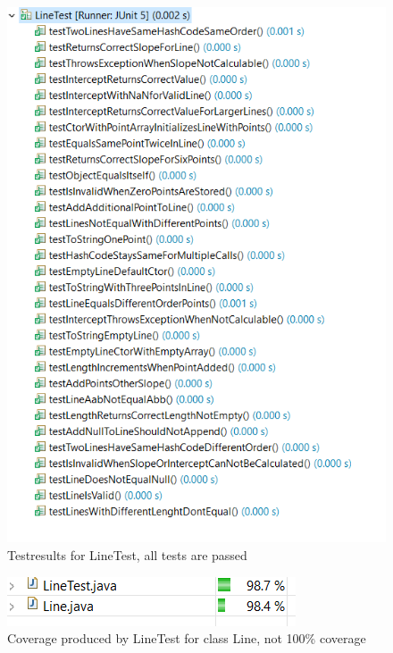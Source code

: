 \begin{figure}[p!]
    \begin{center}
        \includegraphics{img/testresults.png}
        \caption{Testresults for LineTest, all tests are passed}
        \label{fig:test_results}
    \end{center}
\end{figure}

\begin{figure}[p!]
    \begin{center}
        \includegraphics{img/testcoverage.png}
        \caption{Coverage produced by LineTest for class Line, not 100\% coverage}
        \label{fig:test_cov}
       \end{center}
\end{figure}

